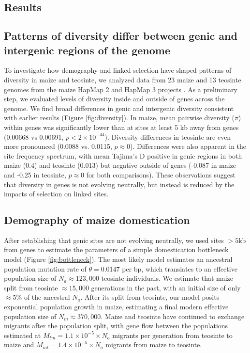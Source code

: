 \documentclass{pnastwo}
\begin{document}
\begin{article}
\section{Results}

\subsection{Patterns of diversity differ between genic and  intergenic regions of the genome} %
To investigate how demography and linked selection have shaped patterns of diversity in maize and teosinte, we analyzed data from 23 maize and 13 teosinte genomes from the maize HapMap 2 and HapMap 3 projects \cite{chia2012, bukowski2015}. As a preliminary step, we evaluated levels of diversity inside and outside of genes across the genome. We find broad differences in genic and intergenic diversity consistent with earlier results  \cite{hufford2012}(Figure \ref{fig:diversity}).  In maize, mean pairwise diversity ($\pi$) within genes was significantly lower than at sites at least 5 kb away from genes (0.00668 vs 0.00691, $p<2\times 10^{-44}$). 
Diversity differences in teosinte are even more pronounced (0.0088 vs. 0.0115, $p\approx 0$). 
Differences were also apparent in the site frequency spectrum, with mean Tajima's D positive in genic regions in both maize (0.4) and teosinte (0.013) but negative outside of genes (-0.087 in maize and -0.25 in teosinte, $p\approx 0$ for both comparisons).
These observations suggest that diversity in genes is not evolving neutrally, but instead is reduced by the impacts of selection on linked sites. 



\subsection{Demography of maize domestication} %
After establishing that genic sites are not evolving neutrally, we used sites $>5$kb from genes to estimate the parameters of a simple domestication bottleneck model  (Figure \ref{fig:bottleneck}). 
The most likely model estimates an ancestral population mutation rate of $\theta=0.0147$ per bp, which translates to an effective population size of $N_a \approx 123,000$ teosinte individuals.
We estimate that maize split from teosinte $\approx 15,000$ generations in the past, with an initial size of only $\approx 5\% $ of the ancestral $N_a$. 
After its split from teosinte, our model posits exponential population growth in maize, estimating a final modern effective population size of $N_m \approx 370,000$.
Maize and teosinte have continued to exchange migrants after the population split, with gene flow between the populations estimated at $M_{tm} =  1.1 \times 10^{-5} \times N_a $  migrants per generation from teosinte to maize and $M_{mt} =  1.4 \times 10^{-5} \times N_a$ migrants from maize to teosinte. 




\end{article}
\end{document}
